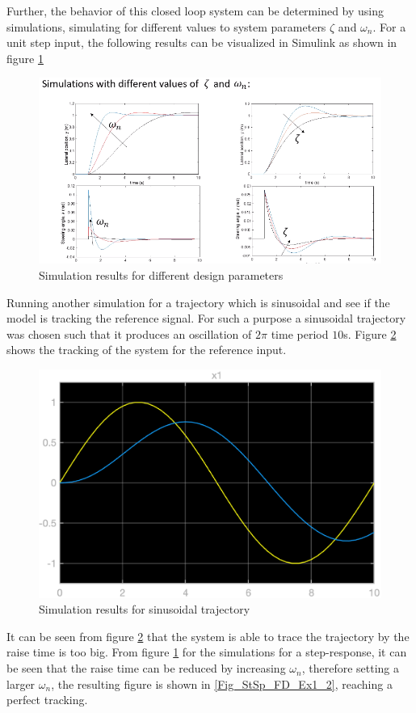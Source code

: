 Further, the behavior of this closed loop system can be determined by using simulations, simulating for different values to system parameters $\zeta$ and $\omega_{n}$. For a unit step input, the following results can be visualized in Simulink as shown in figure \ref{Fig_StSp_FD_Ex1}
\begin{figure}[h!]
	\centering
	\includegraphics[width=\linewidth]{Bilder/StSp_FD_Ex1}
	\caption{Simulation results for different design parameters}
	\label{Fig_StSp_FD_Ex1}
\end{figure}
Running another simulation for a trajectory which is sinusoidal and see if the model is tracking the reference signal. For such a purpose a sinusoidal trajectory was chosen such that it produces an oscillation of $2 \pi$ time period $10$s. Figure \ref{Fig_StSp_FD_Ex1_1} shows the tracking of the system for the reference input.
\begin{figure}[h!]
	\centering
	\includegraphics[width=0.65\linewidth]{Bilder/StSp_FD_Ex1_1.eps}
	\caption{Simulation results for sinusoidal trajectory}
	\label{Fig_StSp_FD_Ex1_1}
\end{figure}
\newpage
It can be seen from figure \ref{Fig_StSp_FD_Ex1_1} that the system is able to trace the trajectory by the raise time is too big. From figure \ref{Fig_StSp_FD_Ex1} for the simulations for a step-response, it can be seen that the raise time can be reduced by increasing $\omega_{n}$, therefore setting a larger $\omega_{n}$, the resulting figure is shown in \ref{Fig_StSp_FD_Ex1_2}, reaching a perfect tracking.
